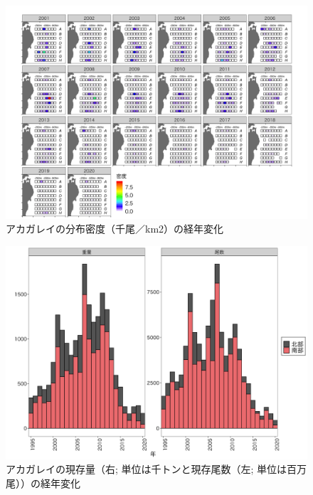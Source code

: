 \documentclass[11pt]{article} %
\begin{document}
\begin{linenumbers}
\begin{figure}[h]
  \centering
  \includegraphics[width = 14cm]{アカガレイdens.png}
  \caption{アカガレイの分布密度（千尾／km2）の経年変化}
\end{figure}

\begin{figure}[h]
  \centering
  \includegraphics[width = 14cm]{アカガレイtrend.png}
  \caption{アカガレイの現存量（右; 単位は千トンと現存尾数（左; 単位は百万尾））の経年変化}
\end{figure}


\end{linenumbers}
\end{document}
